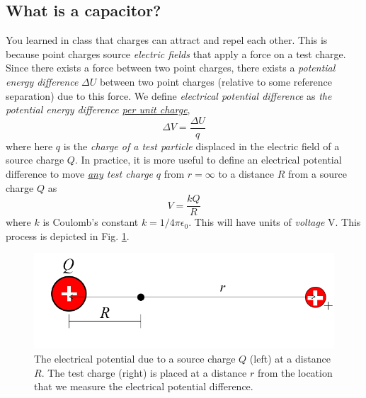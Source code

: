 \documentclass[12pt]{report}
\begin{document}
\subsection{What is a capacitor?}
You  learned in class that charges can attract and repel each other. This is because point charges source \textit{electric fields} that apply a force on a test charge. Since there exists a force between two point charges, there exists a \textit{potential energy difference}  $\Delta U$ between two point charges (relative to some reference separation) due to this force. We define  \textit{electrical potential difference} as \textit{the potential energy difference  \underline{per unit charge}}, 
\begin{equation}
\Delta V = \frac{\Delta U}{q}
\label{Eq:ElectricPotential}
\end{equation}
where here $q$ is the \textit{charge of a test particle} displaced in the electric field of a source charge $Q$. In practice, it is more useful to define an electrical potential difference to move \textit{\underline{any} test charge} $q$ from $r=\infty$ to a distance $R$ from a source charge $Q$ as
\begin{equation}
V = \frac{k Q}{R}
\label{Eq:ElectricPotential_point}
\end{equation}
where $k$ is Coulomb's constant $k = {1}/{4\pi \epsilon_0}$. This will have units of \textit{voltage} V. This process is depicted in Fig. \ref{Fig:ElectricPotential_point}.
\begin{figure}[h]
\centering
\includegraphics[width=0.7 \textwidth]{lab1-electric-potential.png}
\caption{The electrical potential due to a source charge $Q$ (left) at a distance $R$. The test charge (right) is placed at a distance $r$ from the location that we measure the electrical potential difference.}
\label{Fig:ElectricPotential_point}
\end{figure}
\end{document}
